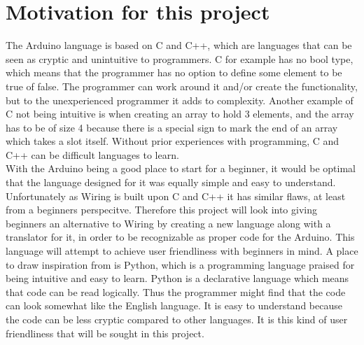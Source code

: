 \section{Motivation for this project}\label{introduction:motivation}
The Arduino language is based on C and C++, which are languages that can be seen as cryptic and unintuitive to programmers. C for example has no bool type, which means that the programmer has no option to define some element to be true of false. The programmer can work around it and/or create the functionality, but to the unexperienced programmer it adds to complexity. Another example of C not being intuitive is when creating an array to hold 3 elements, and the array has to be of size 4 because there is a special sign to mark the end of an array which takes a slot itself.  Without prior experiences with programming, C and C++ can be difficult languages to learn. \\

With the Arduino being a good place to start for a beginner, it would be optimal that the language designed for it was equally simple and easy to understand. Unfortunately as Wiring is built upon C and C++ it has similar flaws, at least from a beginners perspecitve. Therefore this project will look into giving beginners an alternative to Wiring by creating a new language along with a translator for it, in order to be recognizable as proper code for the Arduino. This language will attempt to achieve user friendliness with beginners in mind. A place to draw inspiration from is Python, which is a programming language praised for being intuitive and easy to learn.  Python is a declarative language which means that code can be read logically.  Thus the programmer might find that the code can look somewhat like the English language. It is easy to understand because the code can be less cryptic compared to other languages. It is this kind of user friendliness that will be sought in this project.